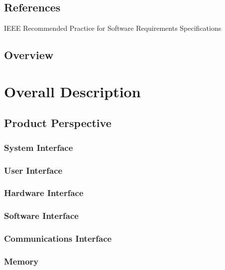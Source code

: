 \documentclass[12pt]{article}
\begin{document}
{			
        \subsection{References}
			{IEEE Recommended Practice for Software Requirements Specifications}
	
	
        \subsection{Overview}
	
	
\pagebreak
	\section{Overall Description}
		 
		 
        \subsection{Product Perspective}
        
        
        	\subsubsection{System Interface}
        	

            \subsubsection{User Interface}
            

            \subsubsection{Hardware Interface}
            
            
            \subsubsection{Software Interface} 
                       
            
            \subsubsection{Communications Interface} 
            
            
            \subsubsection{Memory}
            
}
\end{document}
